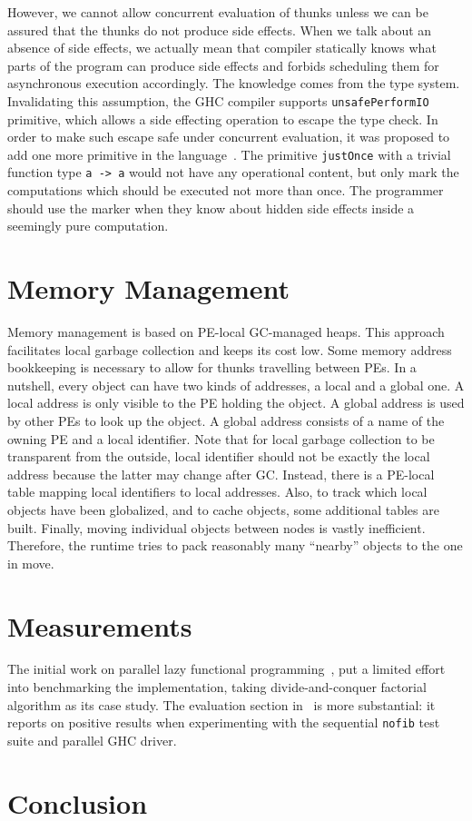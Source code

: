 \documentclass[11pt]{extarticle}
\begin{document}
However, we cannot allow concurrent evaluation of thunks unless we can be assured that the thunks do not produce side effects.
When we talk about an absence of side effects, we actually mean that compiler statically knows what parts of the program can produce side effects and forbids scheduling them for asynchronous execution accordingly. The knowledge comes from the type system. Invalidating this assumption, the GHC compiler supports \texttt{unsafePerformIO} primitive, which allows a side effecting operation to escape the type check. In order to make such escape safe under concurrent evaluation, it was proposed to add one more primitive in the language~\cite{Harris05}. The primitive \texttt{justOnce} with a trivial function type \texttt{a -> a} would not have any operational content, but only mark the computations which should be executed not more than once. The programmer should use the marker when they know about hidden side effects inside a seemingly pure computation.

\section{Memory Management}

Memory management is based on PE-local GC-managed heaps. This approach facilitates local garbage collection and keeps its cost low. Some memory address bookkeeping is necessary to allow for thunks travelling between PEs. In a nutshell, every object can have two kinds of addresses, a local and a global one. A local address is only visible to the PE holding the object. A global address is used by other PEs to look up the object. A global address consists of a name of the owning PE and a local identifier. Note that for local garbage collection to be transparent from the outside, local identifier should not be exactly the local address because the latter may change after GC. Instead, there is a PE-local table mapping local identifiers to local addresses. Also, to track which local objects have been globalized, and to cache objects, some additional tables are built. Finally, moving individual objects between nodes is vastly inefficient. Therefore, the runtime tries to pack reasonably many ``nearby'' objects to the one in move.

\section{Measurements}

The initial work on parallel lazy functional programming~\cite{Trinder96}, put a limited effort into benchmarking the implementation, taking divide-and-conquer factorial algorithm as its case study. The evaluation section in~\cite{Harris05} is more substantial: it reports on positive results when experimenting with the sequential \texttt{nofib} test suite and parallel GHC driver.

\section{Conclusion}


\nocite{*}


\end{document}
